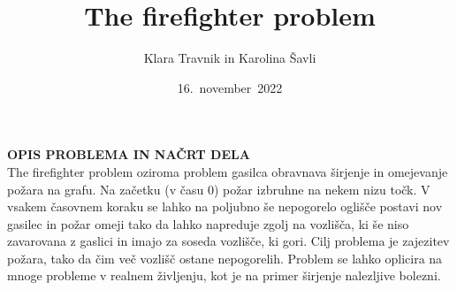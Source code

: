 \documentclass[a4paper, 11pt]{article}
\title{\textbf{\LARGE{The firefighter problem}}}
\author{Klara Travnik in Karolina Šavli}
\date{16.\ november\ 2022}
\begin{document}
\maketitle

\noindent \textbf{OPIS PROBLEMA IN NAČRT DELA} \\

The firefighter problem oziroma problem gasilca obravnava širjenje in omejevanje požara
na grafu. Na začetku (v času $0$) požar izbruhne na nekem nizu točk. V vsakem časovnem
koraku se lahko na poljubno še nepogorelo oglišče postavi nov gasilec in požar omeji tako da lahko
napreduje zgolj na vozlišča, ki še niso zavarovana z gaslici in imajo za soseda vozlišče, ki gori.
Cilj problema je zajezitev požara, tako da čim več vozlišč ostane nepogorelih. 
Problem se lahko oplicira na mnoge probleme v realnem življenju, kot je 
na primer širjenje nalezljive bolezni. \\
\end{document}

